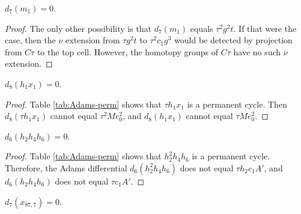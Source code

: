 \begin{lemma}
\label{lem:d7-m1}
$d_7(m_1) = 0$.
\end{lemma}

\begin{proof}
The only other possibility is that $d_7(m_1)$ equals $\tau^2 g^2 t$.
If that were the case, then the $\nu$ extension from
$\tau g^2 t$ to $\tau^2 c_1 g^3$ would be detected by projection
from $C\tau$ to the top cell.  However, the homotopy groups of
$C\tau$ have no such $\nu$ extension.
\end{proof}

\begin{lemma}
\label{lem:d8-h1x1}
$d_8(h_1 x_1) = 0$.
\end{lemma}

\begin{proof}
Table \ref{tab:Adams-perm} shows that $\tau h_1 x_1$ is a permanent
cycle.
Then $d_8(\tau h_1 x_1)$ cannot equal 
$\tau^2 M e_0^2$, and $d_8(h_1 x_1)$ cannot equal
$\tau M e_0^2$.
\end{proof}

\begin{lemma}
\label{lem:d6-h2h4h6}
$d_6(h_2 h_4 h_6) = 0$.
\end{lemma}

\begin{proof}
Table \ref{tab:Adams-perm} shows that $h_2^2 h_4 h_6$ is a permanent
cycle.  Therefore, the Adams differential
$d_6(h_2^2 h_4 h_6)$ does not equal
$\tau h_2 c_1 A'$, and $d_6(h_2 h_4 h_6)$ does not equal
$\tau c_1 A'$.
\end{proof}



\begin{lemma}
\label{lem:d7-x87,7}
$d_7(x_{87,7}) = 0$.
\end{lemma}

